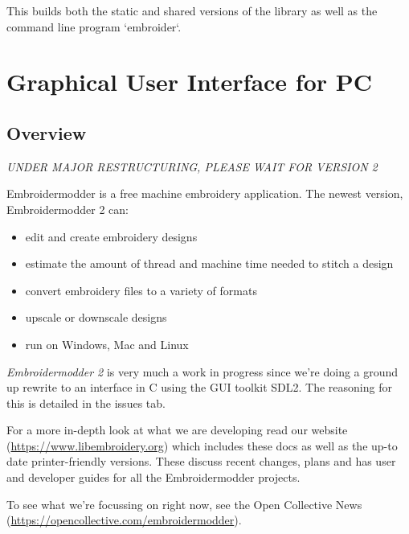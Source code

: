 \documentclass[10pt]{report}
\begin{document}
This builds both the static and shared versions of the library as well
as the command line program `embroider`.

\citep{packard1992pcl}
\citep{linuxcncsrc}
\citep{linuxcnc}
\citep{adobe1990postscript}
\citep{postscript1999postscript}
\citep{eduTechDST}
\citep{cups}
\citep{millOperatorsManual}
\citep{oberg1914machinery}
\citep{dxf_reference}
\citep{embroidermodder_source_code}
\citep{libembroidery_source_code}
\citep{acatina}
\citep{kde_tajima}
\citep{wotsit_archive}
\citep{wotsit_siterip}
\citep{fineemb_dst}
\citep{edutechwiki_dst}

\section{Graphical User Interface for PC}
\label{GUI}

\subsection{Overview}

\emph{UNDER MAJOR RESTRUCTURING, PLEASE WAIT FOR VERSION 2}

Embroidermodder is a free machine embroidery application.
The newest version, Embroidermodder 2 can:

\begin{itemize}
\item edit and create embroidery designs
\item estimate the amount of thread and machine time needed to stitch a design
\item convert embroidery files to a variety of formats
\item upscale or downscale designs
\item run on Windows, Mac and Linux
\end{itemize}

\emph{Embroidermodder 2} is very much a work in progress since we're doing a ground
up rewrite to an interface in C using the GUI toolkit SDL2.
The reasoning for this is detailed in the issues tab.

For a more in-depth look at what we are developing read our
website (\url{https://www.libembroidery.org}) which includes these docs as well
as the up-to date printer-friendly versions. These discuss recent changes,
plans and has user and developer guides for all the Embroidermodder projects.

To see what we're focussing on right now, see the Open Collective
News (\url{https://opencollective.com/embroidermodder}).
\end{document}

